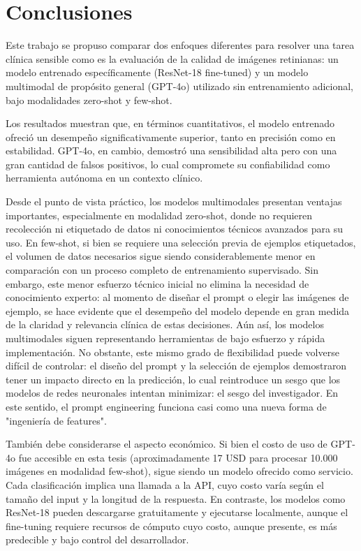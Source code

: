 \chapter*{Conclusiones}

Este trabajo se propuso comparar dos enfoques diferentes para resolver una tarea clínica sensible como es la evaluación de la calidad de imágenes retinianas: un modelo entrenado específicamente (ResNet-18 fine-tuned) y un modelo multimodal de propósito general (GPT-4o) utilizado sin entrenamiento adicional, bajo modalidades zero-shot y few-shot.

Los resultados muestran que, en términos cuantitativos, el modelo entrenado ofreció un desempeño significativamente superior, tanto en precisión como en estabilidad. GPT-4o, en cambio, demostró una sensibilidad alta pero con una gran cantidad de falsos positivos, lo cual compromete su confiabilidad como herramienta autónoma en un contexto clínico.

Desde el punto de vista práctico, los modelos multimodales presentan ventajas importantes, especialmente en modalidad zero-shot, donde no requieren recolección ni etiquetado de datos ni conocimientos técnicos avanzados para su uso. En few-shot, si bien se requiere una selección previa de ejemplos etiquetados, el volumen de datos necesarios sigue siendo considerablemente menor en comparación con un proceso completo de entrenamiento supervisado. Sin embargo, este menor esfuerzo técnico inicial no elimina la necesidad de conocimiento experto: al momento de diseñar el prompt o elegir las imágenes de ejemplo, se hace evidente que el desempeño del modelo depende en gran medida de la claridad y relevancia clínica de estas decisiones. Aún así, los modelos multimodales siguen representando herramientas de bajo esfuerzo y rápida implementación. No obstante, este mismo grado de flexibilidad puede volverse difícil de controlar: el diseño del prompt y la selección de ejemplos demostraron tener un impacto directo en la predicción, lo cual reintroduce un sesgo que los modelos de redes neuronales intentan minimizar: el sesgo del investigador. En este sentido, el prompt engineering funciona casi como una nueva forma de "ingeniería de features".

También debe considerarse el aspecto económico. Si bien el costo de uso de GPT-4o fue accesible en esta tesis (aproximadamente 17 USD para procesar 10.000 imágenes en modalidad few-shot), sigue siendo un modelo ofrecido como servicio. Cada clasificación implica una llamada a la API, cuyo costo varía según el tamaño del input y la longitud de la respuesta. En contraste, los modelos como ResNet-18 pueden descargarse gratuitamente y ejecutarse localmente, aunque el fine-tuning requiere recursos de cómputo cuyo costo, aunque presente, es más predecible y bajo control del desarrollador.

